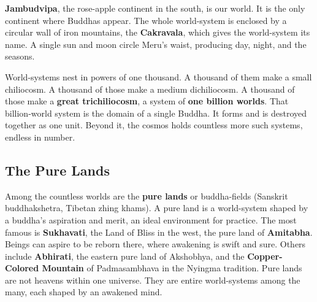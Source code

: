 \textbf{Jambudvipa}, the rose-apple continent in the south, is our world. It is the only continent where Buddhas appear. The whole world-system is enclosed by a circular wall of iron mountains, the \textbf{Cakravala}, which gives the world-system its name. A single sun and moon circle Meru's waist, producing day, night, and the seasons.

World-systems nest in powers of one thousand. A thousand of them make a small chiliocosm. A thousand of those make a medium dichiliocosm. A thousand of those make a \textbf{great trichiliocosm}, a system of \textbf{one billion worlds}. That billion-world system is the domain of a single Buddha. It forms and is destroyed together as one unit. Beyond it, the cosmos holds countless more such systems, endless in number.

\subsection{The Pure Lands}

Among the countless worlds are the \textbf{pure lands} or buddha-fields (Sanskrit buddhakshetra, Tibetan zhing khams). A pure land is a world-system shaped by a buddha's aspiration and merit, an ideal environment for practice. The most famous is \textbf{Sukhavati}, the Land of Bliss in the west, the pure land of \textbf{Amitabha}. Beings can aspire to be reborn there, where awakening is swift and sure. Others include \textbf{Abhirati}, the eastern pure land of Akshobhya, and the \textbf{Copper-Colored Mountain} of Padmasambhava in the Nyingma tradition. Pure lands are not heavens within one universe. They are entire world-systems among the many, each shaped by an awakened mind.
